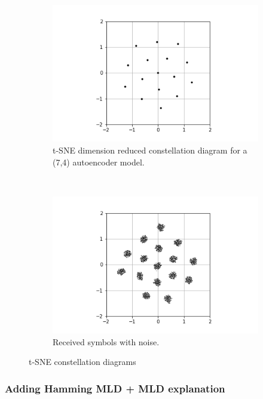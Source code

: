 \documentclass[12pt,onecolumn,letterpaper]{article}
\begin{document}
\begin{figure}[t!]
   \centering
   \begin{subfigure}[t]{0.2\textwidth}
       \centering
       \includegraphics[width=\linewidth]{figures/leaky_relu_7_4_constellation_diagram.png}
       \caption{t-SNE dimension reduced constellation diagram for a (7,4) autoencoder model.}
   \end{subfigure}
   ~
   \begin{subfigure}[t]{0.2\textwidth}
       \centering
       \includegraphics[width=\linewidth]{figures/tSNE_7_4_constellation_diagram_with_noise_200.png}
       \caption{Received symbols with noise.}
   \end{subfigure}
   \caption{t-SNE constellation diagrams}
   \label{fig:tSneConstellationDiags}
\end{figure}


\subsubsection{Adding Hamming MLD + MLD explanation}
\end{document}
